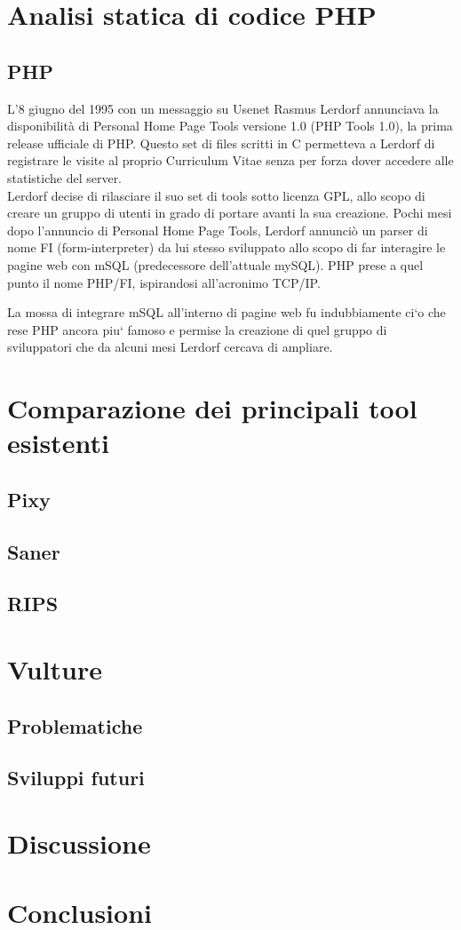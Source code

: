 \chapter{Analisi statica di codice PHP}

\section{PHP}
L’8 giugno del 1995 con un messaggio su Usenet Rasmus Lerdorf annunciava la disponibilità di Personal Home Page Tools versione 1.0 (PHP Tools 1.0), la prima release ufficiale di PHP. Questo set di files scritti in C permetteva a Lerdorf di registrare le visite al proprio Curriculum Vitae senza per forza dover accedere alle statistiche del server.\\
Lerdorf decise di rilasciare il suo set di tools sotto licenza GPL, allo scopo di creare un gruppo di utenti in grado di portare avanti la sua creazione. Pochi mesi dopo l’annuncio di Personal Home Page Tools, Lerdorf annunciò un parser di nome FI (form-interpreter) da lui stesso sviluppato allo scopo di far interagire le pagine web con mSQL (predecessore dell’attuale mySQL). PHP prese a quel punto il nome PHP/FI, ispirandosi all'acronimo TCP/IP.

La mossa di integrare mSQL all’interno di pagine web fu indubbiamente ci`o che rese PHP ancora piu` famoso e permise la creazione di quel gruppo di sviluppatori che da alcuni mesi Lerdorf cercava di ampliare.

\chapter{Comparazione dei principali tool esistenti}

\section{Pixy}

\section{Saner}

\section{RIPS}

\chapter{Vulture}

\section{Problematiche}

\section{Sviluppi futuri}

\chapter{Discussione}

\chapter{Conclusioni}